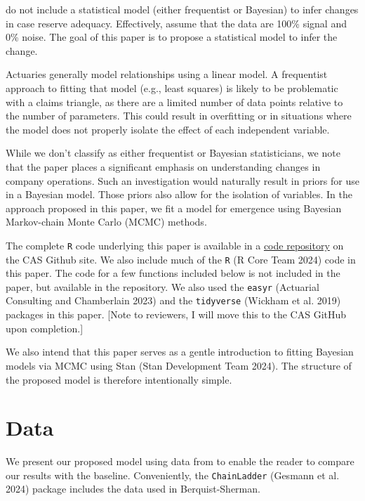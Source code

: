 \documentclass[
  letterpaper,
  DIV=11,
  numbers=noendperiod]{scrartcl}
\begin{document}
\bs do not include a statistical model (either frequentist or Bayesian)
to infer changes in case reserve adequacy. Effectively, \bs assume that
the data are 100\% signal and 0\% noise. The goal of this paper is to
propose a statistical model to infer the change.

Actuaries generally model relationships using a linear model. A
frequentist approach to fitting that model (e.g., least squares) is
likely to be problematic with a claims triangle, as there are a limited
number of data points relative to the number of parameters. This could
result in overfitting or in situations where the model does not properly
isolate the effect of each independent variable.

While we don't classify \bs as either frequentist or Bayesian
statisticians, we note that the paper places a significant emphasis on
understanding changes in company operations. Such an investigation would
naturally result in priors for use in a Bayesian model. Those priors
also allow for the isolation of variables. In the approach proposed in
this paper, we fit a model for emergence using Bayesian Markov-chain
Monte Carlo (MCMC) methods.

The complete \texttt{R} code underlying this paper is available in a
\href{https://github.com/rajesh06/resv_call_2026}{code repository} on
the CAS Github site. We also include much of the \texttt{R} (R Core Team
2024) code in this paper. The code for a few functions included below is
not included in the paper, but available in the repository. We also used
the \texttt{easyr} (Actuarial Consulting and Chamberlain 2023) and the
\texttt{tidyverse} (Wickham et al. 2019) packages in this paper. {[}Note
to reviewers, I will move this to the CAS GitHub upon completion.{]}

We also intend that this paper serves as a gentle introduction to
fitting Bayesian models via MCMC using Stan (Stan Development Team
2024). The structure of the proposed model is therefore intentionally
simple.

\section{Data}\label{data}

We present our proposed model using data from \bs to enable the reader
to compare our results with the \bs baseline. Conveniently, the
\texttt{ChainLadder} (Gesmann et al. 2024) package includes the data
used in Berquist-Sherman.
\end{document}
